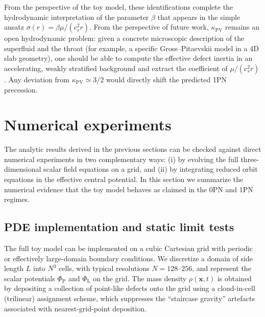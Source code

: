 \documentclass[11pt]{article}
\newcommand{\cS}{c_s}
\newcommand{\PhiP}{\Phi_{\mathrm{P}}}
\newcommand{\PhiL}{\Phi_{\mathrm{L}}}
\begin{document}
From the perspective of the toy model, these identifications complete the hydrodynamic interpretation of the parameter $\beta$ that appears in the simple ansatz $\sigma(r) = \beta \mu/(\cS^2 r)$. From the perspective of future work, $\kappa_{\mathrm{PV}}$ remains an open hydrodynamic problem: given a concrete microscopic description of the superfluid and the throat (for example, a specific Gross--Pitaevskii model in a 4D slab geometry), one should be able to compute the effective defect inertia in an accelerating, weakly stratified background and extract the coefficient of $\mu/(\cS^2 r)$. Any deviation from $\kappa_{\mathrm{PV}} \simeq 3/2$ would directly shift the predicted 1PN precession.

\section{Numerical experiments}
\label{sec:numerics}

The analytic results derived in the previous sections can be checked against direct numerical experiments in two complementary ways:
(i) by evolving the full three-dimensional scalar field equations on a grid, and
(ii) by integrating reduced orbit equations in the effective central potential.
In this section we summarize the numerical evidence that the toy model behaves as claimed in the 0PN and 1PN regimes.

\subsection{PDE implementation and static limit tests}
\label{sec:numerics_static}

The full toy model can be implemented on a cubic Cartesian grid with periodic or effectively large-domain boundary conditions. We discretize a domain of side length $L$ into $N^3$ cells, with typical resolutions $N = 128$--$256$, and represent the scalar potentials $\PhiP$ and $\PhiL$ on the grid. The mass density $\rho(\mathbf{x},t)$ is obtained by depositing a collection of point-like defects onto the grid using a cloud-in-cell (trilinear) assignment scheme, which suppresses the ``staircase gravity'' artefacts associated with nearest-grid-point deposition.
\end{document}
